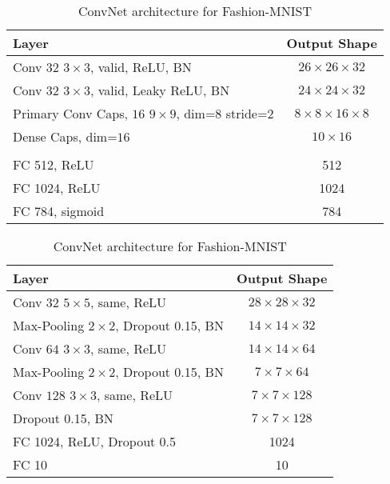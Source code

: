 \begin{table}
	\centering
	
	\begin{tabular}{lc}
		\toprule
		Layer	& Output Shape \\ 
		\midrule 
		Conv $32$ $3\times3$, valid, ReLU, BN	&  $26\times26\times32$ \\ 
		\midrule 
		Conv $32$ $3\times3$, valid, Leaky ReLU, BN	&  $24\times24\times32$\\ 
		\midrule 
		Primary Conv Caps, $16$ $9\times9$, dim=$8$	stride=$2$ &  $8\times8\times16\times8$\\ 
		\midrule 
		Dense Caps, dim=$16$	&  $10\times16$\\ 
		\midrule 
		& \\
		\midrule
		FC 512, ReLU	& 512 \\
		\midrule
		FC 1024, ReLU	& 1024 \\
		\midrule
		FC 784, sigmoid	& 784 \\
		\bottomrule
	\end{tabular}
	\caption{CapsNet architecture for Fashion-MNIST}
	\label{tab:capsnet:fashion}
	
	\vspace{0.75cm}
	
	\begin{tabular}{lc}
		\toprule 
		Layer	&  Output Shape \\ 
		\midrule
		Conv $32$ $5\times5$, same,	ReLU & $28\times28\times32$ \\ 
		\midrule
		Max-Pooling $2\times2$, Dropout 0.15, BN	&  $14\times14\times32$ \\ 
		\midrule 
		Conv $64$ $3\times3$, same, ReLU	& $14\times14\times64$ \\ 
		\midrule 
		Max-Pooling $2\times2$, Dropout 0.15, BN	& $7\times7\times64$ \\
		\midrule
		Conv $128$ $3\times3$, same, ReLU	& $7\times7\times128$ \\
		\midrule
		Dropout 0.15, BN	& $7\times7\times128$ \\
		\midrule
		FC 1024, ReLU, Dropout 0.5 & 1024 \\
		\midrule
		FC 10 & 10\\
		\bottomrule
	\end{tabular} 
	\caption{ConvNet architecture for Fashion-MNIST}
	\label{tab:convnet:fashion}
\end{table}


